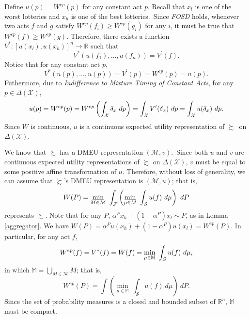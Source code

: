 \documentclass[12pt, notitlepage]{article}
\begin{document}
{Define $u(p)=W^{ep}(p)$ for any constant act $p$. Recall that }$x_{l}$ is
one of the worst lotteries and $x_{h}$ is one of the best lotteries.{\ Since 
\textit{FOSD} holds, whenever two acts $f$ and $g$ satisfy $%
W^{ep}(f_{i})\geq W^{ep}(g_{i})$ for any }$i$, it must be true that $%
W^{ep}(f)\geq W^{ep}(g)$. {Therefore, there exists a function $V^{\ast
}:[u(x_{l}),u(x_{h})]^{n}\rightarrow \mathbb{R}$ such that%
\begin{equation*}
V^{\ast }(u(f_{1}),\dots ,u(f_{n}))=V^{\prime }(f).
\end{equation*}%
Notice that for any constant act $p$,%
\begin{equation*}
V^{\ast }(u(p),\dots ,u(p))=V^{\prime }(p)=W^{ep}(p)=u(p).
\end{equation*}%
Futhermore, due to \textit{Indifference to Mixture Timing of Constant Acts},
for any }$p\in \Delta (\mathcal{X})$,%
\begin{equation*}
u(p)=W^{ep}(p)=W^{ep}\left( \int_{\mathcal{X}}\delta _{x}~dp\right) =\int_{%
\mathcal{X}}V^{\prime }(\delta _{x})~dp=\int_{\mathcal{X}}u(\delta _{x})~dp.
\end{equation*}%
{Since $W$ is continuous, $u$ is a continuous expected utility
representation of }$\succsim ${\ on $\Delta (\mathcal{X})$.}

{We know that $\succsim $ has a DMEU representation }$(\mathcal{M},v)$.{\
Since both }$u$ and $v$ are continuous expected utility representations of $%
\succsim $ on $\Delta (\mathcal{X})$, $v$ must be equal to some positive
affine transformation of $u$. Therefore, without loss of generality, we can
assume that $\succsim $'s DMEU representation is $(\mathcal{M},u)$; that is,{%
\begin{equation*}
W(P)=\min_{M\in \mathcal{M}}~\int_{\mathcal{F}}\left( \underset{\mu \in M}{%
\min }~\int_{\mathcal{S}}u(f)~d\mu \right) ~dP
\end{equation*}%
represents $\succsim $. Note that for any $P$, $\alpha ^{P}x_{h}+(1-\alpha
^{P})x_{l}\sim P$, as in Lemma \ref{aggregator}.} We have $W(P)=\alpha
^{P}u(x_{h})+(1-\alpha ^{P})u(x_{l})=W^{ep}(P)${. In particular, for any act 
$f$,%
\begin{equation*}
W^{ep}(f)=V^{\ast }(f)=W(f)=\underset{\mu \in \mathbb{M}}{\min }~\int_{%
\mathcal{S}}u(f)~d\mu ,
\end{equation*}%
in which }$\mathbb{M}=\bigcup_{M\in \mathcal{M}}M$; {that is,%
\begin{equation*}
W^{ep}(P)=\int \left( \underset{\mu \in \mathbb{M}}{\min }~\int_{\mathcal{S}%
}u(f)~d\mu \right) ~dP.
\end{equation*}%
S}ince the set of probability measures is a closed and bounded subset of $%
\mathbb{R}^{n}$, $\mathbb{M}$ must be compact.
\end{document}
